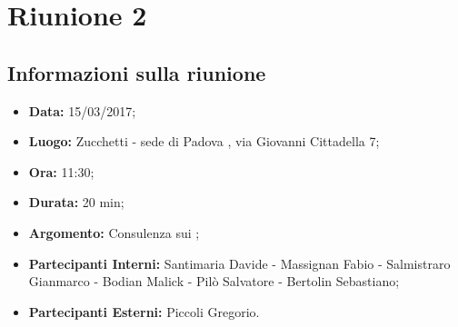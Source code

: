 	\section{Riunione 2}
	  \subsection{Informazioni sulla riunione}
	    \begin{itemize}
	      \item \textbf{Data: } 15/03/2017;
	      \item \textbf{Luogo: } Zucchetti - sede di Padova , via Giovanni Cittadella 7;
	      \item \textbf{Ora: } 11:30;
	      \item \textbf{Durata: } 20 min;
	      \item \textbf{Argomento: } Consulenza sui ;
	      \item \textbf{Partecipanti Interni:} Santimaria Davide - Massignan Fabio - Salmistraro Gianmarco - Bodian Malick - Pilò Salvatore - Bertolin Sebastiano;
	      \item \textbf{Partecipanti Esterni:} Piccoli Gregorio.
	    \end{itemize}

